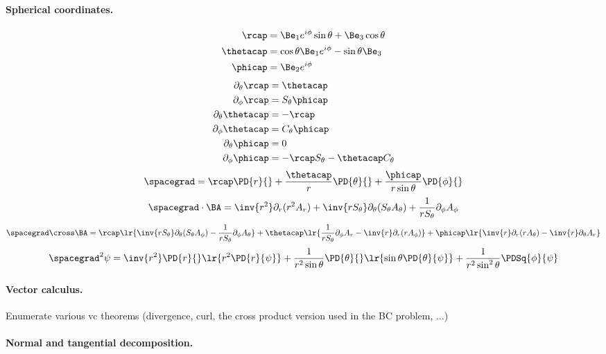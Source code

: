 \paragraph{Spherical coordinates.}
%
\begin{equation}\label{eqn:usefulFormulas:840}
\begin{aligned}
\rcap &= \Be_1 e^{i\phi} \sin\theta + \Be_3 \cos\theta \\
\thetacap &= \cos\theta \Be_1 e^{i\phi} - \sin\theta \Be_3 \\
\phicap &= \Be_2 e^{i\phi}
\end{aligned}
\end{equation}
%
\begin{equation}\label{eqn:usefulFormulas:860}
\begin{aligned}
\partial_{\theta}{\rcap}      &= \thetacap \\
\partial_{\phi}{\rcap}        &= S_\theta \phicap \\
\partial_{\theta}{\thetacap}  &= -\rcap \\
\partial_{\phi}{\thetacap}    &= C_\theta \phicap \\
\partial_{\theta}{\phicap}    &= 0 \\
\partial_{\phi}{\phicap}      &= -\rcap S_\theta - \thetacap C_\theta
\end{aligned}
\end{equation}
%
\begin{dmath}\label{eqn:usefulFormulas:880}
\spacegrad
=
\rcap \PD{r}{} +
\frac{\thetacap}{r} \PD{\theta}{} +
\frac{\phicap}{r\sin\theta} \PD{\phi}{}
\end{dmath}
%
\begin{dmath}\label{eqn:usefulFormulas:900}
\spacegrad \cdot \BA
=
\inv{r^2} \partial_r (r^2 A_r)
+ \inv{r S_\theta} \partial_\theta (S_\theta A_\theta)
+ \frac{1}{r S_\theta} \partial_\phi A_\phi
\end{dmath}
%
\begin{dmath}\label{eqn:usefulFormulas:920}
\spacegrad \cross \BA
=
   \rcap \lr{
       \inv{r S_\theta} \partial_\theta (S_\theta A_\phi)
      -\frac{1}{r S_\theta} \partial_\phi A_\theta
   }
   + \thetacap \lr{
      \frac{1}{r S_\theta} \partial_\phi A_r
      -\inv{r} \partial_r (r A_\phi)
   }
   + \phicap \lr{
        \inv{r} \partial_r (r A_\theta)
      - \inv{r} \partial_\theta A_r
   }
\end{dmath}
%
\begin{dmath}\label{eqn:usefulFormulas:940}
\spacegrad^2 \psi
=
    \inv{r^2} \PD{r}{} \lr{ r^2 \PD{r}{ \psi} }
   + \frac{1}{r^2 \sin\theta} \PD{\theta}{} \lr{ \sin\theta \PD{\theta}{ \psi } }
   + \frac{1}{r^2 \sin^2\theta} \PDSq{\phi}{ \psi}
\end{dmath}
%
\paragraph{Vector calculus.}
%
Enumerate various vc theorems (divergence, curl, the cross product version used in the BC problem, ...)
%
\paragraph{Normal and tangential decomposition.}
%

